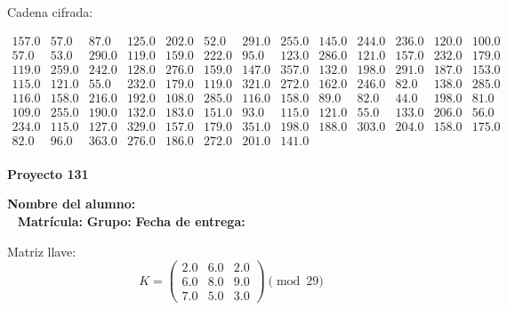 \documentclass[12pt]{article}
\begin{document}
Cadena cifrada:
\begin{center}
$\begin{array}{lllllllllllll}
157.0 & 57.0 & 87.0 & 125.0 & 202.0 & 52.0 & 291.0 & 255.0 & 145.0 & 244.0 & 236.0 & 120.0 & 100.0\\
57.0 & 53.0 & 290.0 & 119.0 & 159.0 & 222.0 & 95.0 & 123.0 & 286.0 & 121.0 & 157.0 & 232.0 & 179.0\\
119.0 & 259.0 & 242.0 & 128.0 & 276.0 & 159.0 & 147.0 & 357.0 & 132.0 & 198.0 & 291.0 & 187.0 & 153.0\\
115.0 & 121.0 & 55.0 & 232.0 & 179.0 & 119.0 & 321.0 & 272.0 & 162.0 & 246.0 & 82.0 & 138.0 & 285.0\\
116.0 & 158.0 & 216.0 & 192.0 & 108.0 & 285.0 & 116.0 & 158.0 & 89.0 & 82.0 & 44.0 & 198.0 & 81.0\\
109.0 & 255.0 & 190.0 & 132.0 & 183.0 & 151.0 & 93.0 & 115.0 & 121.0 & 55.0 & 133.0 & 206.0 & 56.0\\
234.0 & 115.0 & 127.0 & 329.0 & 157.0 & 179.0 & 351.0 & 198.0 & 188.0 & 303.0 & 204.0 & 158.0 & 175.0\\
82.0 & 96.0 & 363.0 & 276.0 & 186.0 & 272.0 & 201.0 & 141.0\\
\end{array}$
\end{center}

\newpage


\textbf{Proyecto 131}

\textbf{Nombre del alumno:} \underline{\hspace{13cm}}\\\
\vspace{1cm}
\textbf{Matrícula:} \underline{\hspace{4cm}} \hspace{1cm}
\textbf{Grupo:} \underline{\hspace{2cm}}
\textbf{Fecha de entrega:} \underline{\hspace{2cm}}

\medskip

Matriz llave:
\[
K = \begin{pmatrix}
2.0 & 6.0 & 2.0\\
6.0 & 8.0 & 9.0\\
7.0 & 5.0 & 3.0
\end{pmatrix} \pmod{29}
\]
\end{document}
